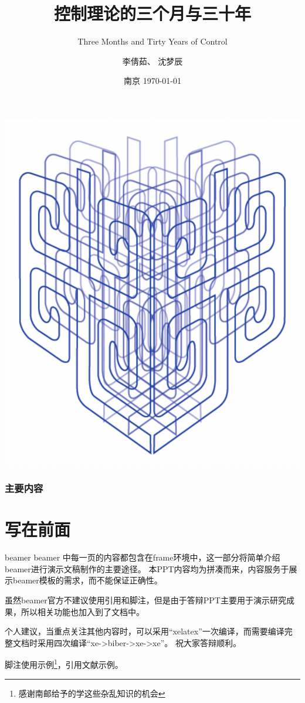 \documentclass[10pt]{ctexbeamer}
\title[南京邮电大学]{控制理论的三个月与三十年}
\subtitle{Three Months and Tirty Years of Control}
\author[李倩茹]{李倩茹、 沈梦辰}
\institute[自动化学院、人工智能学院]{
南京邮电大学

自动化学院、人工智能学院
}
\date[南京 \today]{南京 \today}
\begin{document}
\frame{\titlepage}

{
    \raggedright
    \includegraphics[trim=-680pt 0 0 -200pt,height=0.8\paperheight]{pic/njupt.pattern.pdf}
}
\begin{frame}
\frametitle{主要内容}
\tableofcontents
\end{frame}

\section{写在前面}

\begin{frame}{beamer}
  beamer 中每一页的内容都包含在frame环境中，这一部分将简单介绍beamer进行演示文稿制作的主要途径。
  本PPT内容均为拼凑而来，内容服务于展示beamer模板的需求，而不能保证正确性。

  虽然beamer官方不建议使用引用和脚注，但是由于答辩PPT主要用于演示研究成果，所以相关功能也加入到了文档中。

  个人建议，当重点关注其他内容时，可以采用“xelatex”一次编译，而需要编译完整文档时采用四次编译“xe->biber->xe->xe”。
  祝大家答辩顺利。

  脚注使用示例\footnote{感谢南邮给予的学这些杂乱知识的机会}，引用文献示例。
  
\end{frame}
\end{document}
